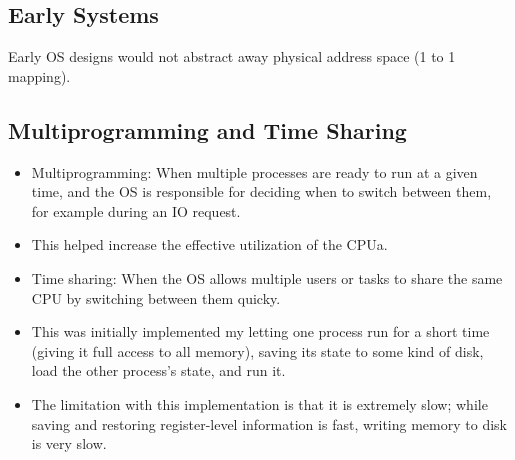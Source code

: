 \documentclass[11pt, a4paper]{article}
\theoremstyle{definition}
\theoremstyle{remark}
\begin{document}
\subsection{Early Systems}
Early OS designs would not abstract away physical address space (1 to 1 mapping).
\subsection{Multiprogramming and Time Sharing}
\begin{itemize}
  \item Multiprogramming: When multiple processes are ready to run at a given time, and the OS is responsible for deciding when to switch between them, for example during an IO request.
  \item This helped increase the effective utilization of the CPUa. 
  \item Time sharing: When the OS allows multiple users or tasks to share the same CPU by switching between them quicky.
  \item This was initially implemented my letting one process run for a short time (giving it full access to all memory), saving its state to some kind of disk, load the other process's state, and run it. 
  \item The limitation with this implementation is that it is extremely slow; while saving and restoring register-level information is fast, writing memory to disk is very slow.
\end{itemize}
\end{document}
